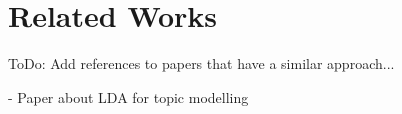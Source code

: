 \section{Related Works} %
\label{sec:related_works}

\colorbox{yellow!30}{ToDo:} Add references to papers that have a similar approach...

- Paper about LDA for topic modelling